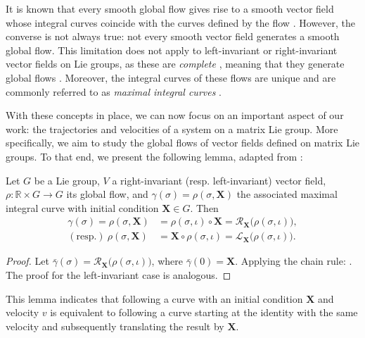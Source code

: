 It is known that every smooth global flow gives rise to a smooth vector field whose integral curves coincide with the curves defined by the flow \citep[p. 211]{Lee2012}. However, the converse is not always true: not every smooth vector field generates a smooth global flow. This limitation does not apply to left-invariant or right-invariant vector fields on Lie groups, as these are \emph{complete} \citep[p. 570]{Gallier2020}, meaning that they generate global flows \citep[p. 215]{Lee2012}. Moreover, the integral curves of these flows are unique \citep[p. 18]{Duistermaat2012} and are commonly referred to as \emph{maximal integral curves} \citep[p. 570]{Gallier2020}.

With these concepts in place, we can now focus on an important aspect of our work: the trajectories and velocities of a system on a matrix Lie group. More specifically, we aim to study the global flows of vector fields defined on matrix Lie groups. To that end, we present the following lemma, adapted from \citet[p. 570]{Gallier2020}:
\begin{lemma}\label{lemma:lie-group-flow}
    Let $G$ be a Lie group, $V$ a right-invariant (resp. left-invariant) vector field, $\rho:\mathbb{R}\times G\to G$ its global flow, and $\gamma(\sigma)=\rho(\sigma, \mathbf{X})$ the associated maximal integral curve with initial condition $\mathbf{X}\in G$. Then
    \begin{align*}
        \gamma(\sigma) = \rho(\sigma, \mathbf{X}) &=  \rho(\sigma, \iota)\circ\mathbf{X} = \mathcal{R}_\mathbf{X}\bigl(\rho(\sigma, \iota)\bigr),\\
        (\text{resp.})\ \rho(\sigma, \mathbf{X}) &=  \mathbf{X}\circ\rho(\sigma, \iota) = \mathcal{L}_\mathbf{X}\bigl(\rho(\sigma, \iota)\bigr).
    \end{align*}
\end{lemma}
\begin{proof}
    Let $\bar{\gamma}(\sigma) = \mathcal{R}_\mathbf{X}\bigl(\rho(\sigma, \iota)\bigr)$, where $\bar{\gamma}(0) = \mathbf{X}$. Applying the chain rule:
    . The proof for the left-invariant case is analogous.
\end{proof}
This lemma indicates that following a curve with an initial condition $\mathbf{X}$ and velocity $v$ is equivalent to following a curve starting at the identity with the same velocity and subsequently translating the result by $\mathbf{X}$.

